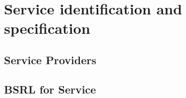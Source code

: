 \chapter{Service identification and specification}

\section{Service Providers}


\section{BSRL for Service}

\FloatBarrier
\newpage